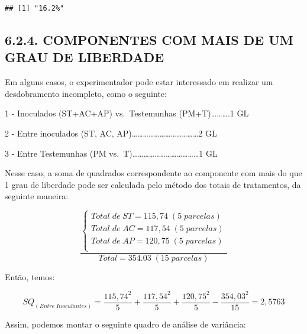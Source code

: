 \documentclass[
]{book}
\begin{document}
\begin{verbatim}
## [1] "16.2%"
\end{verbatim}

\hypertarget{componentes-com-mais-de-um-grau-de-liberdade}{%
\subsection{6.2.4. COMPONENTES COM MAIS DE UM GRAU DE LIBERDADE}\label{componentes-com-mais-de-um-grau-de-liberdade}}

Em alguns casos, o experimentador pode estar interessado em realizar um desdobramento incompleto, como o seguinte:

1 - Inoculados (ST+AC+AP) vs.~Testemunhas (PM+T)\ldots\ldots\ldots.1 GL

2 - Entre inoculados (ST, AC, AP)\ldots\ldots\ldots\ldots\ldots\ldots\ldots\ldots\ldots\ldots\ldots\ldots2 GL

3 - Entre Testemunhas (PM vs.~T)\ldots\ldots\ldots\ldots\ldots\ldots\ldots\ldots\ldots\ldots\ldots\ldots1 GL

Nesse caso, a soma de quadrados correspondente ao componente com mais do que 1 grau de liberdade pode ser calculada pelo método dos totais de tratamentos, da seguinte maneira:

\[
\frac{\begin{cases} 
Total\;de\;ST=115,74\;(5\;parcelas)  \\ 
Total\;de\;AC=117,54\;(5\;parcelas)  \\ 
Total\;de\;AP=120,75\;(5\;parcelas)  \\   \end{cases}}
{Total=354.03\;(15\;parcelas)}
\]

Então, temos:

\[
SQ_{(Entre\;Inoculantes)}=\frac{115,74^2}{5}+\frac{117,54^2}{5}+\frac{120,75^2}{5}-\frac{354,03^2}{15}=2,5763
\]

Assim, podemos montar o seguinte quadro de análise de variância:
\end{document}
